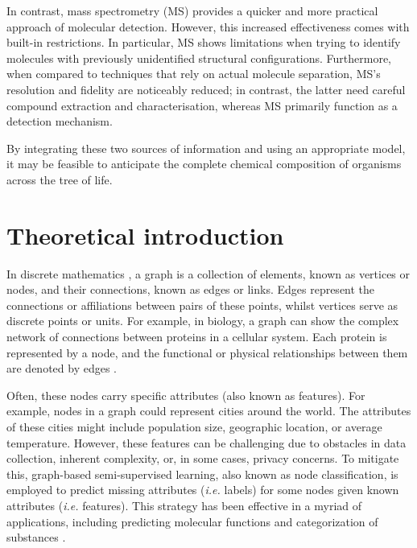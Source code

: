 \documentclass[
11pt, %
oneside, %
english, %
singlespacing, %
headsepline, %
chapterinoneline, %
]{MastersDoctoralThesis} %
\begin{document}
In contrast, mass spectrometry (MS) provides a quicker and more practical approach of molecular detection. However, this increased effectiveness comes with built-in restrictions. In particular, MS shows limitations when trying to identify molecules with previously unidentified structural configurations. Furthermore, when compared to techniques that rely on actual molecule separation, MS's resolution and fidelity are noticeably reduced; in contrast, the latter need careful compound extraction and characterisation, whereas MS primarily function as a detection mechanism.

By integrating these two sources of information and using an appropriate model, it may be feasible to anticipate the complete chemical composition of organisms across the tree of life. 




\chapter{Theoretical introduction}\label{chap:Theoretical introduction}
In discrete mathematics \cite{johnsonbaughDiscreteMathematics2018}, a graph is a collection of elements, known as vertices or nodes, and their connections, known as edges or links. Edges represent the connections or affiliations between pairs of these points, whilst vertices serve as discrete points or units. For example, in biology, a graph can show the complex network of connections between proteins in a cellular system. Each protein is represented by a node, and the functional or physical relationships between them are denoted by edges \cite{trudeauIntroductionGraphTheory1993}. 

Often, these nodes carry specific attributes (also known as features). For example, nodes in a graph could represent cities around the world. The attributes of these cities might include population size, geographic location, or average temperature. However, these features can be challenging due to obstacles in data collection, inherent complexity, or, in some cases, privacy concerns. To mitigate this, graph-based semi-supervised learning, also known as node classification, is employed to predict missing attributes (\textit{i.e.} labels) for some nodes given known attributes (\textit{i.e.} features). This strategy has been effective in a myriad of applications, including predicting molecular functions and categorization of substances \cite{NIPS2016_390e9825, liDeeperInsightsGraph2018}.
\end{document}
